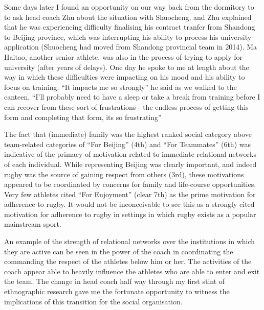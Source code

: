 Some days later I found an opportunity on our way back from the dormitory to to ask head coach Zhu about the situation with Shuocheng, and Zhu explained that he was experiencing difficulty finalising his contract tranfer from Shandong to Beijing province, which was interrupting his ability to process his university application (Shuocheng had moved from Shandong provincial team in 2014).  Ma Haitao, another senior athlete, was also in the process of trying to apply for university (after years of delays).  One day he spoke to me at length about the way in which these difficulties were impacting on his mood and his ability to focus on training. ``It impacts me so strongly'' he said as we walked to the canteen, ``I’ll probably need to have a sleep or take a break from training before I can recover from these sort of frustrations - the endless process of getting this form and completing that form, its so frustrating''

The fact that (immediate) family was the highest ranked social category above team-related categories of ``For Beijing'' (4th) and ``For Teammates'' (6th) was indicative of the primacy of motivation related to immediate relational networks of each individual.  While representing Beijing was clearly important, and indeed rugby was the source of gaining respect from others (3rd), these motivations appeared to be coordinated by concerns for family and life-course opportunities.  Very few athletes cited ``For Enjoyment'' (clear 7th) as the prime motivation for adherence to rugby.  It would not be inconceivable to see this as a strongly cited motivation for adherence to rugby in settings in which rugby exists as a popular mainstream sport.

An example of the strength of relational networks over the institutions in which they are active can be seen in the power of the coach in coordinating the commanding the respect of the athletes below him or her.  The activities of the coach appear able to heavily influence the athletes who are able to enter and exit the team.  The change in head coach half way through my first stint of ethnographic research gave me the fortunate opportunity to witness the implications of this transition for the social organisation.

